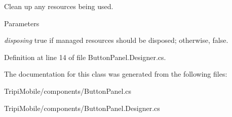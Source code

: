 Clean up any resources being used. 
\begin{DoxyParams}{Parameters}
\item[{\em disposing}]true if managed resources should be disposed; otherwise, false.\end{DoxyParams}


Definition at line 14 of file ButtonPanel.Designer.cs.

The documentation for this class was generated from the following files:\begin{DoxyCompactItemize}
\item 
TripiMobile/components/ButtonPanel.cs\item 
TripiMobile/components/ButtonPanel.Designer.cs\end{DoxyCompactItemize}
